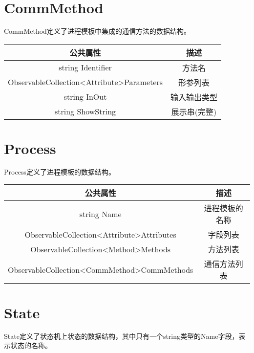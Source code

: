 \section{CommMethod}
CommMethod定义了进程模板中集成的通信方法的数据结构。
\begin{table}[h]
	\centering
	\begin{tabular}{|c|c|}
		\hline
		\textbf{公共属性}                                                   & \textbf{描述} \\ \hline
		string Identifier                                               & 方法名         \\ \hline
		ObservableCollection\textless{}Attribute\textgreater Parameters & 形参列表        \\ \hline
		string InOut                                                    & 输入输出类型      \\ \hline
		string ShowString                                               & 展示串(完整)     \\ \hline
	\end{tabular}
\end{table}

\section{Process}
Process定义了进程模板的数据结构。
\begin{table}[h]
	\centering
	\begin{tabular}{|c|c|}
		\hline
		\textbf{公共属性}                                                     & \textbf{描述} \\ \hline
		string Name                                                       & 进程模板的名称     \\ \hline
		ObservableCollection\textless{}Attribute\textgreater Attributes   & 字段列表        \\ \hline
		ObservableCollection\textless{}Method\textgreater Methods         & 方法列表        \\ \hline
		ObservableCollection\textless{}CommMethod\textgreater CommMethods & 通信方法列表      \\ \hline
	\end{tabular}
\end{table}

\section{State}
State定义了状态机上状态的数据结构，其中只有一个string类型的Name字段，表示状态的名称。

